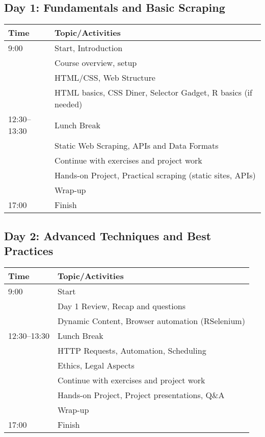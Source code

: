 \documentclass[12pt]{article}
\begin{document}
\subsection*{Day 1: Fundamentals and Basic Scraping}
\FloatBarrier
\begin{table}[!ht]
\begin{tabular}{ll}
\toprule
Time & Topic/Activities \\
\midrule
9:00 & Start, Introduction \\
& Course overview, setup \\
 & HTML/CSS, Web Structure  \\
& HTML basics, CSS Diner, Selector Gadget, R basics (if needed) \\
12:30--13:30 & Lunch Break \\
& Static Web Scraping, APIs and Data Formats \\
 & Continue with exercises and project work \\
 & Hands-on Project, Practical scraping (static sites, APIs) \\
 & Wrap-up \\
17:00 & Finish \\
\bottomrule
\end{tabular}
\end{table}
\FloatBarrier

\subsection*{Day 2: Advanced Techniques and Best Practices}
\FloatBarrier

\begin{table}[h]
\begin{tabular}{ll}
\toprule
Time & Topic/Activities \\
\midrule
9:00 & Start \\
& Day 1 Review, Recap and questions \\
 & Dynamic Content, Browser automation (RSelenium) \\
12:30--13:30 & Lunch Break \\
 & HTTP Requests, Automation, Scheduling \\
 & Ethics, Legal Aspects \\
 & Continue with exercises and project work \\
 & Hands-on Project, Project presentations, Q\&A \\
 & Wrap-up \\
17:00 & Finish \\
\bottomrule
\end{tabular}
\end{table}
\FloatBarrier
\end{document}
